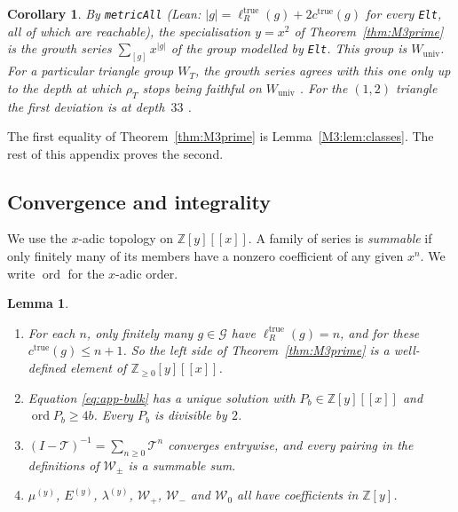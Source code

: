 \documentclass[11pt]{article}
\theoremstyle{plain}
\newtheorem{lemma}[theorem]{Lemma}
\newtheorem{corollary}[theorem]{Corollary}
\theoremstyle{definition}
\theoremstyle{remark}
\begin{document}
\begin{corollary}\label{cor:M3prime-growth}
By \texttt{metricAll} (Lean: $|g|=\ell_R^{\mathrm{true}}(g)+2c^{\mathrm{true}}(g)$ for every
\texttt{Elt}, all of which are reachable), the specialisation $y=x^2$ of
Theorem~\ref{thm:M3prime} is the growth series $\sum_{[g]}x^{|g|}$ of the group modelled by
\texttt{Elt}. This group is $W_{\mathrm{univ}}$. For a particular triangle group $W_T$, the
growth series agrees with this one only up to the depth at which $\rho_T$ stops being
faithful on $W_{\mathrm{univ}}$
\cite[Theorem ``Effective universality'', \textup{thm:effective-universality}]{Bonfioli2026a}. For
the $(1,2)$ triangle the first deviation is at depth~$33$
\cite[\textup{thm:universality-sharp}]{Bonfioli2026a}.
\end{corollary}

The first equality of Theorem~\ref{thm:M3prime} is Lemma~\ref{M3:lem:classes}. The rest of this
appendix proves the second.

\subsection{Convergence and integrality}\label{app:conv}

We use the $x$-adic topology on $\mathbb Z[y][[x]]$. A family of series is \emph{summable}
if only finitely many of its members have a nonzero coefficient of any given $x^n$. We write
$\operatorname{ord}$ for the $x$-adic order.

\begin{lemma}\label{M3:lem:conv}
\begin{enumerate}
\item[(a)] For each $n$, only finitely many $g\in\mathcal G$ have $\ell_R^{\mathrm{true}}(g)=n$,
  and for these $c^{\mathrm{true}}(g)\le n+1$. So the left side of Theorem~\ref{thm:M3prime} is a
  well-defined element of $\mathbb Z_{\ge0}[y][[x]]$.
\item[(b)] Equation \eqref{eq:app-bulk} has a unique solution with $P_b\in\mathbb Z[y][[x]]$
  and $\operatorname{ord}P_b\ge4b$. Every $P_b$ is divisible by $2$.
\item[(c)] $(I-\mathcal T)^{-1}=\sum_{n\ge0}\mathcal T^n$ converges entrywise, and every pairing
  in the definitions of $\mathcal W_\pm$ is a summable sum.
\item[(d)] $\mu^{(y)}$, $E^{(y)}$, $\lambda^{(y)}$, $\mathcal W_+$, $\mathcal W_-$ and
  $\mathcal W_0$ all have coefficients in $\mathbb Z[y]$.
\end{enumerate}
\end{lemma}
\end{document}
